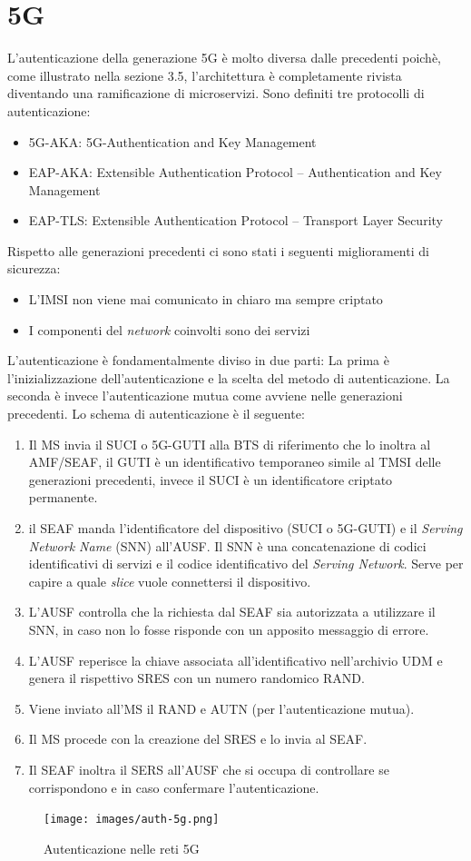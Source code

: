 \clearpage

\section{5G}
L'autenticazione della generazione 5G è molto diversa dalle precedenti poichè, come illustrato nella sezione 3.5, l'architettura è completamente rivista diventando una ramificazione di microservizi.
Sono definiti tre protocolli di autenticazione:
\begin{itemize}
    \item 5G-AKA: 5G-Authentication and Key Management
    \item EAP-AKA: Extensible Authentication Protocol – Authentication and Key Management
    \item EAP-TLS: Extensible Authentication Protocol – Transport Layer Security
\end{itemize}
Rispetto alle generazioni precedenti ci sono stati i seguenti miglioramenti di sicurezza\cite{5g-vs-4g}:
\begin{itemize}
    \item L'IMSI non viene mai comunicato in chiaro ma sempre criptato
    \item I componenti del \textit{network} coinvolti sono dei servizi
\end{itemize}
L'autenticazione è fondamentalmente diviso in due parti: La prima è l'inizializzazione dell'autenticazione e la scelta del metodo di autenticazione.
La seconda è invece l'autenticazione mutua come avviene nelle generazioni precedenti.
Lo schema di autenticazione è il seguente\cite{5g-auth}:
\begin{enumerate}
    \item Il MS invia il SUCI o 5G-GUTI alla BTS di riferimento che lo inoltra al AMF/SEAF,
    il GUTI è un identificativo temporaneo simile al TMSI delle generazioni precedenti, invece il SUCI è un identificatore criptato
    permanente.
    \item il SEAF manda l'identificatore del dispositivo (SUCI o 5G-GUTI) e il \textit{Serving Network Name} (SNN) all'AUSF.
    Il SNN è una concatenazione di codici identificativi di servizi e il codice identificativo del \textit{Serving Network}. Serve per capire 
    a quale \textit{slice} vuole connettersi il dispositivo.
    \item L'AUSF controlla che la richiesta dal SEAF sia autorizzata a utilizzare il SNN, in caso non lo fosse risponde con un 
    apposito messaggio di errore.
    \item L'AUSF reperisce la chiave associata all'identificativo nell'archivio UDM e genera il rispettivo SRES con un numero randomico RAND.
    \item Viene inviato all'MS il RAND e AUTN (per l'autenticazione mutua).
    \item Il MS procede con la creazione del SRES e lo invia al SEAF.
    \item Il SEAF inoltra il SERS all'AUSF che si occupa di controllare se corrispondono e in caso confermare l'autenticazione.
\end{enumerate}
\begin{figure}[h]
    \centering
    \texttt{[image: images/auth-5g.png]}
    \caption{Autenticazione nelle reti 5G}
\end{figure}